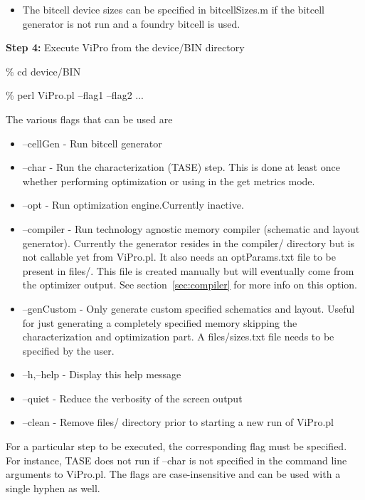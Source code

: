 \begin{description}
\begin{itemize}
\item The bitcell device sizes can be specified in bitcellSizes.m if the bitcell generator is not run and a foundry bitcell is used.

\end{itemize}


\item \textbf{Step 4:} Execute ViPro from the device/BIN directory

\% cd device/BIN

\% perl ViPro.pl --flag1 --flag2 ...

The various flags that can be used are
\begin{itemize}
\item --cellGen       - Run bitcell generator

\item --char          - Run the characterization (TASE) step. This is done at least once whether performing optimization or using in the get metrics mode.

\item --opt           - Run optimization engine.Currently inactive.

\item --compiler      - Run technology agnostic memory compiler (schematic and layout generator). Currently the generator resides in the compiler/ directory but is not callable yet from ViPro.pl. It also needs an optParams.txt file to be present in files/. This file is created manually but will eventually come from the optimizer output. See section~\ref{sec:compiler} for more info on this option.

\item --genCustom     - Only generate custom specified schematics and layout. Useful for just generating a completely specified memory skipping the characterization and optimization part. A files/sizes.txt file needs to be specified by the user.

\item --h,--help      - Display this help message

\item --quiet	      - Reduce the verbosity of the screen output

\item --clean         - Remove files/ directory prior to starting a new run of ViPro.pl
\end{itemize}
For a particular step to be executed, the corresponding flag must be specified. For instance, TASE does not run if --char is not specified in the command line arguments to ViPro.pl. The flags are case-insensitive and can be used with a single hyphen as well.

\end{description}

